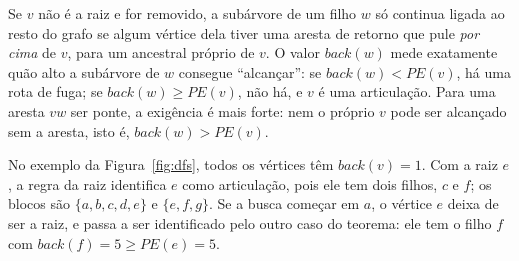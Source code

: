 \begin{intuicao}
Se $v$ não é a raiz e for removido, a subárvore de um filho $w$ só continua ligada ao resto do grafo se algum vértice dela tiver uma aresta de retorno que pule \emph{por cima} de $v$, para um ancestral próprio de $v$. O valor $back(w)$ mede exatamente quão alto a subárvore de $w$ consegue ``alcançar'': se $back(w)<PE(v)$, há uma rota de fuga; se $back(w)\ge PE(v)$, não há, e $v$ é uma articulação. Para uma aresta $vw$ ser ponte, a exigência é mais forte: nem o próprio $v$ pode ser alcançado sem a aresta, isto é, $back(w)>PE(v)$.
\end{intuicao}

No exemplo da Figura~\ref{fig:dfs}, todos os vértices têm $back(v)=1$. Com a raiz $e$, a regra da raiz identifica $e$ como articulação, pois ele tem dois filhos, $c$ e $f$; os blocos são $\{a,b,c,d,e\}$ e $\{e,f,g\}$. Se a busca começar em $a$, o vértice $e$ deixa de ser a raiz, e passa a ser identificado pelo outro caso do teorema: ele tem o filho $f$ com $back(f)=5\ge PE(e)=5$.

